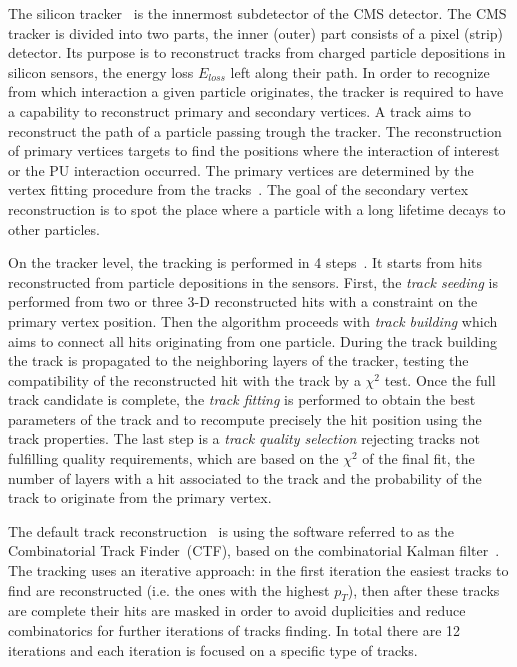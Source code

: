 The silicon tracker~\cite{CMS:1997tlf, CMS:2000eqx} is the innermost subdetector of the CMS detector. The CMS tracker is divided into two parts, the inner (outer) part consists of a pixel (strip) detector.  Its purpose is to reconstruct tracks from charged particle depositions in silicon sensors, the energy loss $E_{loss}$ left along their path. In order to recognize from which interaction a given particle originates, the tracker is required to have a capability to reconstruct primary and secondary vertices. A track aims to reconstruct the path of a particle passing trough the tracker. The reconstruction of primary vertices targets to find the positions where the interaction of interest or the PU interaction occurred. The primary vertices are determined by the vertex fitting procedure from the tracks~\cite{Ball:2007zza}. The goal of the secondary vertex reconstruction is to spot the place where a particle with a long lifetime decays to other particles. 

On the tracker level, the tracking is performed in 4 steps~\cite{website:slidesTracking, website:twikiTracking}. It starts from  hits reconstructed from particle depositions in the sensors. First, the \textit{track seeding} is performed from two or three 3-D reconstructed hits with a constraint on the primary vertex position. Then the algorithm proceeds with \textit{track building} which aims to connect all hits originating from one particle. During the track building the track is propagated to the neighboring layers of the tracker, testing the compatibility of the reconstructed hit with the track by a $\chi^{2}$ test. Once the full track candidate is complete, the \textit{track fitting} is performed to obtain the best parameters of the track and to recompute precisely the hit position using the track properties. The last step is a \textit{track quality selection} rejecting tracks not fulfilling quality requirements, which are based on the $\chi^{2}$ of the final fit, the number of layers with a hit associated to the track and the probability of the track  to originate from the primary vertex.

The default track reconstruction~\cite{Chatrchyan:2014fea} is using the software referred to as the Combinatorial Track Finder~(CTF), based on the combinatorial Kalman filter~\cite{Fruhwirth:1987fm}. The tracking uses an iterative approach: in the first iteration the easiest tracks to find are reconstructed (i.e. the ones with the highest $p_{T}$), then after these tracks are complete their hits are masked in order to avoid duplicities and reduce combinatorics for further iterations of tracks finding. In total there are 12 iterations and each iteration is focused on a specific type of tracks.


